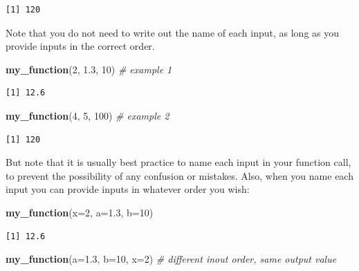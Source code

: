 \documentclass[
]{book}
\newenvironment{Shaded}{\begin{snugshade}}{\end{snugshade}}
\newcommand{\CommentTok}[1]{\textcolor[rgb]{0.56,0.35,0.01}{\textit{#1}}}
\newcommand{\DataTypeTok}[1]{\textcolor[rgb]{0.13,0.29,0.53}{#1}}
\newcommand{\DecValTok}[1]{\textcolor[rgb]{0.00,0.00,0.81}{#1}}
\newcommand{\FloatTok}[1]{\textcolor[rgb]{0.00,0.00,0.81}{#1}}
\newcommand{\KeywordTok}[1]{\textcolor[rgb]{0.13,0.29,0.53}{\textbf{#1}}}
\newcommand{\NormalTok}[1]{#1}
\begin{document}
\begin{verbatim}
[1] 120
\end{verbatim}

Note that you do not need to write out the name of each input, as long as you provide inputs in the correct order.

\begin{Shaded}
\begin{Highlighting}[]
\KeywordTok{my_function}\NormalTok{(}\DecValTok{2}\NormalTok{, }\FloatTok{1.3}\NormalTok{, }\DecValTok{10}\NormalTok{) }\CommentTok{# example 1}
\end{Highlighting}
\end{Shaded}

\begin{verbatim}
[1] 12.6
\end{verbatim}

\begin{Shaded}
\begin{Highlighting}[]
\KeywordTok{my_function}\NormalTok{(}\DecValTok{4}\NormalTok{, }\DecValTok{5}\NormalTok{, }\DecValTok{100}\NormalTok{) }\CommentTok{# example 2}
\end{Highlighting}
\end{Shaded}

\begin{verbatim}
[1] 120
\end{verbatim}

But note that it is usually best practice to name each input in your function call, to prevent the possibility of any confusion or mistakes. Also, when you name each input you can provide inputs in whatever order you wish:

\begin{Shaded}
\begin{Highlighting}[]
\KeywordTok{my_function}\NormalTok{(}\DataTypeTok{x=}\DecValTok{2}\NormalTok{, }\DataTypeTok{a=}\FloatTok{1.3}\NormalTok{, }\DataTypeTok{b=}\DecValTok{10}\NormalTok{)}
\end{Highlighting}
\end{Shaded}

\begin{verbatim}
[1] 12.6
\end{verbatim}

\begin{Shaded}
\begin{Highlighting}[]
\KeywordTok{my_function}\NormalTok{(}\DataTypeTok{a=}\FloatTok{1.3}\NormalTok{, }\DataTypeTok{b=}\DecValTok{10}\NormalTok{, }\DataTypeTok{x=}\DecValTok{2}\NormalTok{) }\CommentTok{# different inout order, same output value}
\end{Highlighting}
\end{Shaded}
\end{document}
